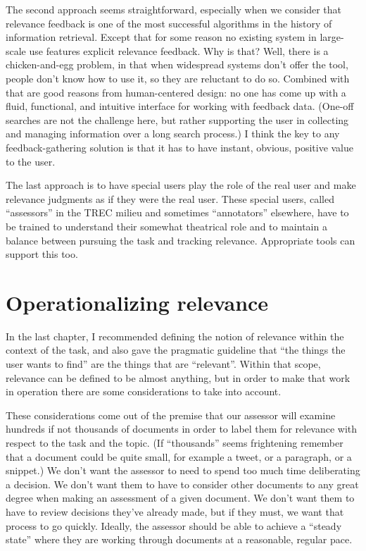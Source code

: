 \documentclass[nobib]{tufte-book}
\begin{document}
The second approach seems straightforward, especially when we consider that relevance feedback is one of the most successful algorithms in the history of information retrieval.  Except that for some reason no existing system in large-scale use features explicit relevance feedback.  Why is that?  Well, there is a chicken-and-egg problem, in that when widespread systems don't offer the tool, people don't know how to use it, so they are reluctant to do so.  Combined with that are good reasons from human-centered design: no one has come up with a fluid, functional, and intuitive interface for working with feedback data.  (One-off searches are not the challenge here, but rather supporting the user in collecting and managing information over a long search process.)  I think the key to any feedback-gathering solution is that it has to have instant, obvious, positive value to the user.

The last approach is to have special users play the role of the real user and make relevance judgments as if they were the real user.  These special users, called ``assessors'' in the TREC milieu and sometimes ``annotators'' elsewhere, have to be trained to understand their somewhat theatrical role and to maintain a balance between pursuing the task and tracking relevance.  Appropriate tools can support this too.

\section{Operationalizing relevance}

In the last chapter, I recommended defining the notion of relevance within the context of the task, and also gave the pragmatic guideline that ``the things the user wants to find'' are the things that are ``relevant''.  Within that scope, relevance can be defined to be almost anything, but in order to make that work in operation there are some considerations to take into account.

These considerations come out of the premise that our assessor will examine hundreds if not thousands of documents in order to label them for relevance with respect to the task and the topic.  (If ``thousands'' seems frightening remember that a document could be quite small, for example a tweet, or a paragraph, or a snippet.)  We don't want the assessor to need to spend too much time deliberating a decision.  We don't want them to have to consider other documents to any great degree when making an assessment of a given document.  We don't want them to have to review decisions they've already made, but if they must, we want that process to go quickly.  Ideally, the assessor should be able to achieve a ``steady state'' where they are working through documents at a reasonable, regular pace.
\end{document}
